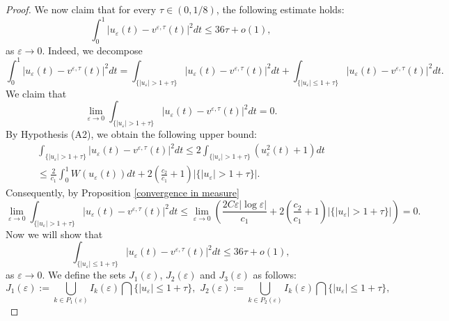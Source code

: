 \documentclass[10pt,a4paper]{amsart}
\begin{document}
\begin{proof}
We now claim that for every $\tau \in (0,1/8)$, the following estimate holds:
\begin{equation}\label{36tau}
    \int_{0}^{1}\left|u_{\varepsilon}(t)-v^{\varepsilon,\tau}(t)\right|^2dt\le36\tau+o(1),
\end{equation}
as $\varepsilon\to0$. Indeed, we decompose 
\begin{equation*}
    \int_{0}^{1}\left|u_{\varepsilon}(t)-v^{\varepsilon,\tau}(t)\right|^2dt=\int_{\{\left|u_{\varepsilon}\right|>1+\tau\}}\left|u_{\varepsilon}(t)-v^{\varepsilon,\tau}(t)\right|^2dt+\int_{\{\left|u_{\varepsilon}\right|\le1+\tau\}}\left|u_{\varepsilon}(t)-v^{\varepsilon,\tau}(t)\right|^2dt.
\end{equation*}
We claim that 
\[
\lim_{\varepsilon\to0}\int_{\{\left|u_{\varepsilon}\right|>1+\tau\}}\left|u_{\varepsilon}(t)-v^{\varepsilon,\tau}(t)\right|^2dt=0.
\]
By Hypothesis {\rm (A2)}, we obtain the following upper bound:
\begin{align*}
    \int_{\{\left|u_{\varepsilon}\right|>1+\tau\}}\left|u_{\varepsilon}(t)-v^{\varepsilon,\tau}(t)\right|^2dt\le2\int_{\{\left|u_{\varepsilon}\right|>1+\tau\}}(u^{2}_{\varepsilon}(t)+1)dt\\
\le\frac{2}{c_{1}}\int_{0}^{1}W(u_{\varepsilon}(t))dt+2\left(\frac{c_{2}}{c_{1}}+1\right)|\{\left|u_{\varepsilon}\right|>1+\tau\}|.
\end{align*}
Consequently, by Proposition \ref{convergence in measure}
\[
\lim_{\varepsilon\to0}\int_{\{\left|u_{\varepsilon}\right|>1+\tau\}}\left|u_{\varepsilon}(t)-v^{\varepsilon,\tau}(t)\right|^2dt\le\lim_{\varepsilon\to0}\left(\frac{2C\varepsilon|\log{\varepsilon}|}{c_{1}}+2\left(\frac{c_{2}}{c_{1}}+1\right)|\{\left|u_{\varepsilon}\right|>1+\tau\}|\right)=0.
\]
Now we will show that
\[
\int_{\{\left|u_{\varepsilon}\right|\le1+\tau\}}\left|u_{\varepsilon}(t)-v^{\varepsilon,\tau}(t)\right|^2dt\le 36\tau+o(1),
\]
as $\varepsilon\to0$. We define the sets $J_1(\varepsilon)$, $J_2(\varepsilon)$ and $J_3(\varepsilon)$ as follows:
\begin{equation*}
    J_{1}(\varepsilon):=\bigcup_{k\in P_{1}(\varepsilon)}I_{k}(\varepsilon)\bigcap \{\left|u_{\varepsilon}\right|\le{1+\tau\}},\,\,J_{2}(\varepsilon):=\bigcup_{k\in P_{2}(\varepsilon)}I_{k}(\varepsilon)\bigcap \{\left|u_{\varepsilon}\right|\le{1+\tau\}},
\end{equation*}

\end{proof}
\end{document}
